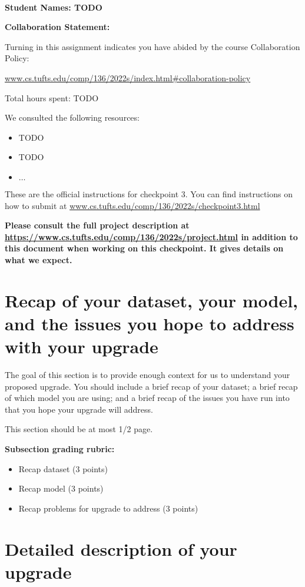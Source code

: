 \documentclass[12pt]{article}
\begin{document}
~~\\ %

{\Large{\bf Student Names: TODO}}


{\Large{\bf Collaboration Statement:}}

Turning in this assignment indicates you have abided by the course Collaboration Policy:

\url{www.cs.tufts.edu/comp/136/2022s/index.html#collaboration-policy}

Total hours spent: TODO

We consulted the following resources:
\begin{itemize}
\item TODO
\item TODO
\item $\ldots$	
\end{itemize}

\newpage

These are the official instructions for checkpoint 3.  You can find instructions on how to submit at \url{www.cs.tufts.edu/comp/136/2022s/checkpoint3.html}

\textbf{Please consult the full project description at \url{https://www.cs.tufts.edu/comp/136/2022s/project.html} in addition to this document when working on this checkpoint.  It gives details on what we expect.}

\section{Recap of your dataset, your model, and the issues you hope to address with your upgrade}

The goal of this section is to provide enough context for us to understand your proposed upgrade.  You should include a brief recap of your dataset; a brief recap of which model you are using; and a brief recap of the issues you have run into that you hope your upgrade will address.

This section should be at most 1/2 page.

\textbf{Subsection grading rubric:}
\begin{itemize}
	\item Recap dataset (3 points)
	\item Recap model (3 points)
	\item Recap problems for upgrade to address (3 points)
\end{itemize}

\section{Detailed description of your upgrade}
\end{document}
